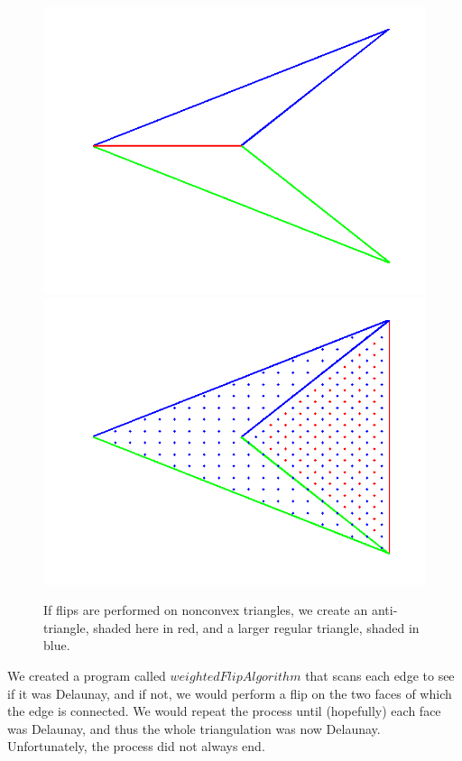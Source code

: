\documentclass[12pt]{article}
\begin{document}
\begin{figure}
\label{antitri}
\centering
\includegraphics[scale = 0.4]{Pictures/antitri1.png}
\includegraphics[scale = 0.4]{Pictures/antitri2.png}
\caption{If flips are performed on nonconvex triangles, we create an anti-triangle, shaded here in red, and a larger regular triangle, shaded in blue.}
\label{AntiTri}
\end{figure}

\noindent We created a program called $weightedFlipAlgorithm$ that scans each edge to see if it was Delaunay, and if not, we would perform a flip on the two faces of which the edge is connected. We would repeat the process until (hopefully) each face was Delaunay, and thus the whole triangulation was now Delaunay. Unfortunately, the process did not always end. \newline
\end{document}
